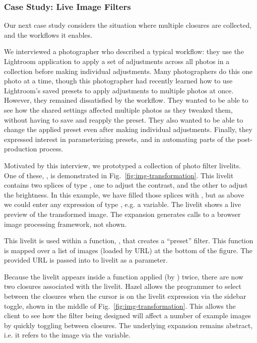 \subsubsection{Case Study: Live Image Filters}\label{sec:image-transformation}
Our next case study
considers the situation where multiple closures are collected, and
the workflows it enables.

We interviewed a photographer
who described a typical workflow:
they use the Lightroom application to
apply a set of adjustments
across all photos in a collection before making
individual adjustments.
Many photographers do this one photo at a time,
though this photographer had recently learned how to
use Lightroom's saved presets to
apply adjustments to multiple photos at once.
However, they remained dissatisfied by the workflow.
They wanted to be able to see how the shared settings affected
multiple photos as they tweaked them, without having to
save and reapply the preset.
They also wanted to be able to change the applied preset
even after making individual adjustments.
Finally, they
expressed interest in parameterizing
presets, and in automating parts of the post-production process.





Motivated by this interview,
we prototyped a collection of photo filter livelits.
One of these, , is demonstrated in Fig.~\ref{fig:img-transformation}. 
This livelit contains two splices of type ,
one to adjust the contrast, and the other to adjust the brightness.
In this example, we have filled those splices with , but
as above we could enter any expression of type , e.g. a variable.
The livelit shows a live preview of the transformed image.
The expansion generates calls to a browser image processing framework, 
not shown.

This livelit is used within a function, , that creates a ``preset'' filter. 
This function is mapped over a list of images (loaded by URL) at the bottom of the figure. 
The provided URL is passed into to livelit as a parameter.

Because the livelit appears inside a function applied (by ) twice, 
there are now two closures associated with the livelit. 
Hazel allows the programmer to select between the closures when 
the cursor is on the livelit expression via the sidebar toggle,
shown in the middle of Fig.~\ref{fig:img-transformation}.
This allows the client to see how the filter being designed will affect a
number of example images by quickly toggling between closures.
The underlying expansion remains abstract, i.e. it refers to the image via the  variable.

